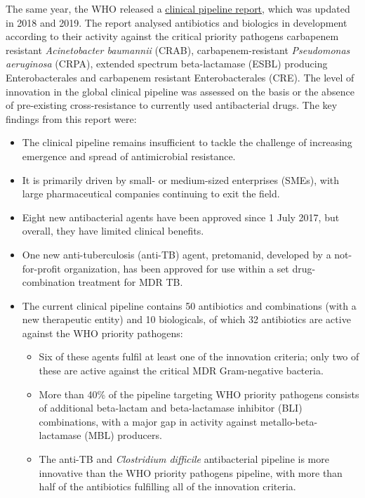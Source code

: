 \documentclass[
  11pt,
  paper=a4,
  ,captions=tableheading
]{scrartcl}
\renewenvironment{quote}{\begin{customblockquote}\list{}{\rightmargin=0em\leftmargin=0em}%
\item\relax\color{blockquote-text}\ignorespaces}{\unskip\unskip\endlist\end{customblockquote}}
\begin{document}
The same year, the WHO released a
\href{https://apps.who.int/iris/bitstream/handle/10665/330420/9789240000193-eng.pdf}{clinical
pipeline report}, which was updated in 2018 and 2019. The report
analysed antibiotics and biologics in development according to their
activity against the critical priority pathogens carbapenem resistant
\emph{Acinetobacter baumannii} (CRAB), carbapenem-resistant
\emph{Pseudomonas aeruginosa} (CRPA), extended spectrum beta-lactamase
(ESBL) producing Enterobacterales and carbapenem resistant
Enterobacterales (CRE). The level of innovation in the global clinical
pipeline was assessed on the basis or the absence of pre-existing
cross-resistance to currently used antibacterial drugs. The key findings
from this report were:

\begin{quote}
\begin{itemize}
\item
  The clinical pipeline remains insufficient to tackle the challenge of
  increasing emergence and spread of antimicrobial resistance.
\item
  It is primarily driven by small- or medium-sized enterprises (SMEs),
  with large pharmaceutical companies continuing to exit the field.
\item
  Eight new antibacterial agents have been approved since 1 July 2017,
  but overall, they have limited clinical benefits.
\item
  One new anti-tuberculosis (anti-TB) agent, pretomanid, developed by a
  not-for-profit organization, has been approved for use within a set
  drug-combination treatment for MDR TB.
\item
  The current clinical pipeline contains 50 antibiotics and combinations
  (with a new therapeutic entity) and 10 biologicals, of which 32
  antibiotics are active against the WHO priority pathogens:

  \begin{itemize}
  \item
    Six of these agents fulfil at least one of the innovation criteria;
    only two of these are active against the critical MDR Gram-negative
    bacteria.
  \item
    More than 40\% of the pipeline targeting WHO priority pathogens
    consists of additional beta-lactam and beta-lactamase inhibitor
    (BLI) combinations, with a major gap in activity against
    metallo-beta-lactamase (MBL) producers.
  \item
    The anti-TB and \emph{Clostridium difficile} antibacterial pipeline
    is more innovative than the WHO priority pathogens pipeline, with
    more than half of the antibiotics fulfilling all of the innovation
    criteria.
  \end{itemize}
\end{itemize}
\end{quote}
\end{document}
